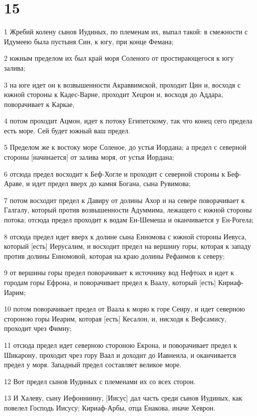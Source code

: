 \chapter{15}

\par 1 Жребий колену сынов Иудиных, по племенам их, выпал такой: в смежности с Идумеею была пустыня Син, к югу, при конце Фемана;
\par 2 южным пределом их был край моря Соленого от простирающегося к югу залива;
\par 3 на юге идет он к возвышенности Акраввимской, проходит Цин и, восходя с южной стороны к Кадес-Варне, проходит Хецрон и, восходя до Аддара, поворачивает к Каркае,
\par 4 потом проходит Ацмон, идет к потоку Египетскому, так что конец сего предела есть море. Сей будет южный ваш предел.
\par 5 Пределом же к востоку море Соленое, до устья Иордана; а предел с северной стороны [начинается] от залива моря, от устья Иордана;
\par 6 отсюда предел восходит к Беф-Хогле и проходит с северной стороны к Беф-Араве, и идет предел вверх до камня Богана, сына Рувимова;
\par 7 потом восходит предел к Давиру от долины Ахор и на севере поворачивает к Галгалу, который против возвышенности Адуммима, лежащего с южной стороны потока; отсюда предел проходит к водам Ен-Шемеша и оканчивается у Ен-Рогела;
\par 8 отсюда предел идет вверх к долине сына Енномова с южной стороны Иевуса, который [есть] Иерусалим, и восходит предел на вершину горы, которая к западу против долины Енномовой, которая на краю долины Рефаимов к северу;
\par 9 от вершины горы предел поворачивает к источнику вод Нефтоах и идет к городам горы Ефрона, и поворачивает предел к Ваалу, который [есть] Кириаф-Иарим;
\par 10 потом поворачивает предел от Ваала к морю к горе Сеиру, и идет северною стороною горы Иеарим, которая [есть] Кесалон, и, нисходя к Вефсамису, проходит чрез Фимну;
\par 11 отсюда предел идет северною стороною Екрона, и поворачивает предел к Шикарону, проходит чрез гору Ваал и доходит до Иавнеила, и оканчивается предел у моря. Западный предел составляет великое море.
\par 12 Вот предел сынов Иудиных с племенами их со всех сторон.
\par 13 И Халеву, сыну Иефонниину, [Иисус] дал часть среди сынов Иудиных, как повелел Господь Иисусу; Кириаф-Арбы, отца Енакова, иначе Хеврон.
